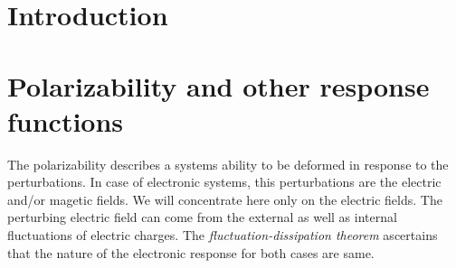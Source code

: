 \documentclass[jcp,groupaddress]{revtex4-1}
\DeclareMathOperator{\erf}{Erf}
\DeclareMathOperator{\erfc}{Erfc}
\newcommand{\diff}{\mathrm{d}}
\newcommand{\abs}[1]{\vert #1\vert}
\begin{document}





 

\section{Introduction}
\section{Polarizability and other response functions}
The polarizability describes a systems ability to be deformed in response to the perturbations. In case of electronic systems, this perturbations are the electric and/or magetic fields. We will concentrate here only on the electric fields. The perturbing electric field can come from the external as well as internal fluctuations of electric charges. The \emph{fluctuation-dissipation theorem}\cite{langreth1977} ascertains that the nature of the electronic response for both cases are same.  
\end{document}
